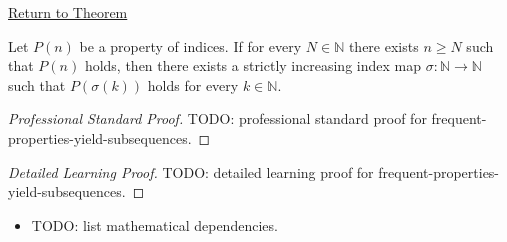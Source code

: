 \newpage
{}
\label{prf:frequent-properties-yield-subsequences}

\begin{remark*}[Return]
\hyperref[thm:frequent-properties-yield-subsequences]{Return to Theorem}
\end{remark*}

\begin{theorem*}
Let $P(n)$ be a property of indices. If for every $N\in\mathbb{N}$ there
exists $n\ge N$ such that $P(n)$ holds, then there exists a strictly
increasing index map $\sigma:\mathbb{N}\to\mathbb{N}$ such that
$P(\sigma(k))$ holds for every $k\in\mathbb{N}$.

\smallskip
\noindent
\end{theorem*}

\begin{proof}[Professional Standard Proof]
\LRAProofBodyStart
TODO: professional standard proof for frequent-properties-yield-subsequences.
\end{proof}

\begin{proof}[Detailed Learning Proof]
\LRAProofBodyStart
TODO: detailed learning proof for frequent-properties-yield-subsequences.
\end{proof}

\begin{remark*}
\end{remark*}

\begin{dependencies}
\begin{itemize}
  \item TODO: list mathematical dependencies.
\end{itemize}
\end{dependencies}

\clearpage
